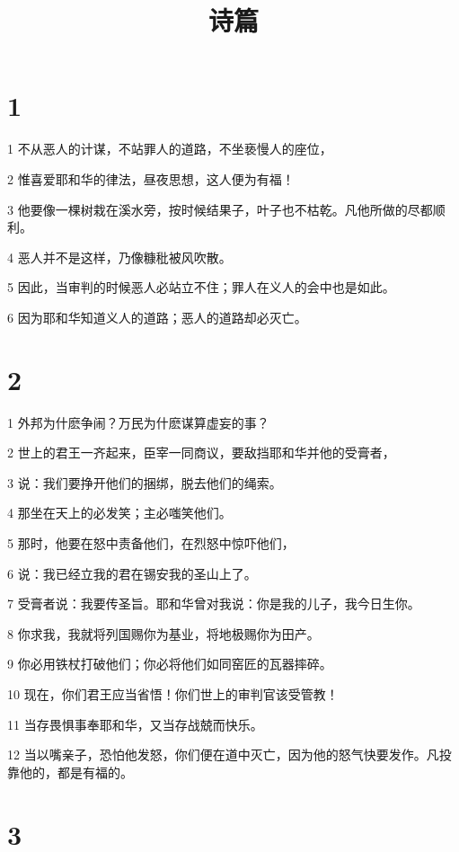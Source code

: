 

\title{诗篇}


\chapter{1}

\par 1 不从恶人的计谋，不站罪人的道路，不坐亵慢人的座位，
\par 2 惟喜爱耶和华的律法，昼夜思想，这人便为有福！
\par 3 他要像一棵树栽在溪水旁，按时候结果子，叶子也不枯乾。凡他所做的尽都顺利。
\par 4 恶人并不是这样，乃像糠秕被风吹散。
\par 5 因此，当审判的时候恶人必站立不住；罪人在义人的会中也是如此。
\par 6 因为耶和华知道义人的道路；恶人的道路却必灭亡。

\chapter{2}

\par 1 外邦为什麽争闹？万民为什麽谋算虚妄的事？
\par 2 世上的君王一齐起来，臣宰一同商议，要敌挡耶和华并他的受膏者，
\par 3 说：我们要挣开他们的捆绑，脱去他们的绳索。
\par 4 那坐在天上的必发笑；主必嗤笑他们。
\par 5 那时，他要在怒中责备他们，在烈怒中惊吓他们，
\par 6 说：我已经立我的君在锡安我的圣山上了。
\par 7 受膏者说：我要传圣旨。耶和华曾对我说：你是我的儿子，我今日生你。
\par 8 你求我，我就将列国赐你为基业，将地极赐你为田产。
\par 9 你必用铁杖打破他们；你必将他们如同窑匠的瓦器摔碎。
\par 10 现在，你们君王应当省悟！你们世上的审判官该受管教！
\par 11 当存畏惧事奉耶和华，又当存战兢而快乐。
\par 12 当以嘴亲子，恐怕他发怒，你们便在道中灭亡，因为他的怒气快要发作。凡投靠他的，都是有福的。

\chapter{3}

